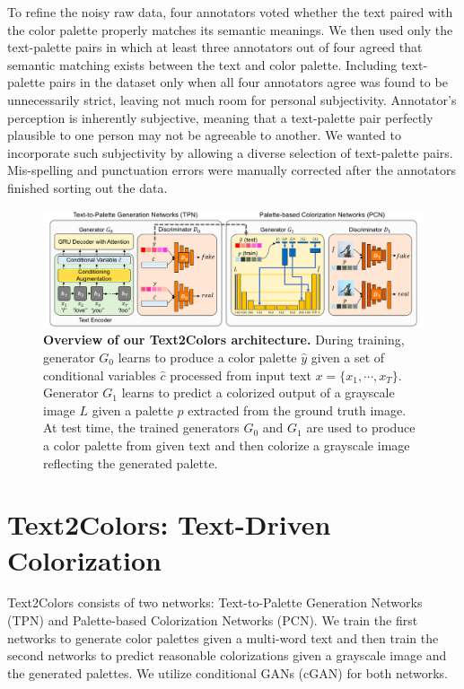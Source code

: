\documentclass[runningheads]{llncs}
\begin{document}
To refine the noisy raw data, four annotators voted whether the text paired with the color palette properly matches its semantic meanings. We then used only the text-palette pairs in which at least three annotators out of four agreed that semantic matching exists between the text and color palette. Including text-palette pairs in the dataset only when all four annotators agree was found to be unnecessarily strict, leaving not much room for personal subjectivity. Annotator’s perception is inherently subjective, meaning that a text-palette pair perfectly plausible to one person may not be agreeable to another. We wanted to incorporate such subjectivity by allowing a diverse selection of text-palette pairs. Mis-spelling and punctuation errors were manually corrected after the annotators finished sorting out the data.


\begin{figure}[t]
\centering
\includegraphics[width=\textwidth]{./full_model.png}
\caption{\textbf{Overview of our Text2Colors architecture.} During training, generator $G_{0}$ learns to produce a color palette $\hat{y}$ given a set of conditional variables $\hat{c}$ processed from input text $x=\{x_{1},\cdots,x_{T}\}$. Generator $G_{1}$ learns to predict a colorized output of a grayscale image $L$ given a palette $p$ extracted from the ground truth image. At test time, the trained generators $G_{0}$ and $G_{1}$ are used to produce a color palette from given text and then colorize a grayscale image reflecting the generated palette.} \label{fig:full_model}
\end{figure}

\section{Text2Colors: Text-Driven Colorization}
Text2Colors consists of two networks: Text-to-Palette Generation Networks (TPN) and Palette-based Colorization Networks (PCN). We train the first networks to generate color palettes given a multi-word text and then train the second networks to predict reasonable colorizations given a grayscale image and the generated palettes. We utilize conditional GANs (cGAN) for both networks. 
\end{document}
